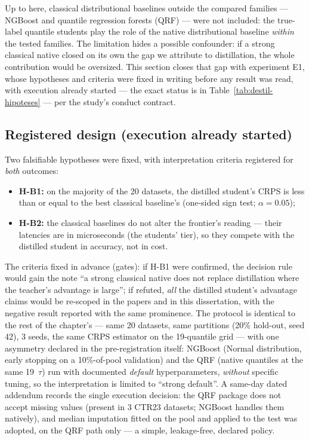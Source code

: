 Up to here, classical distributional baselines outside the compared
families --- NGBoost \citep{duan2020} and quantile regression
forests (QRF) \citep{meinshausen2006} --- were not included: the
true-label quantile students play the role of the native
distributional baseline \emph{within} the tested families. The
limitation hides a possible confounder: if a strong classical native
closed on its own the gap we attribute to distillation, the whole
contribution would be oversized. This section closes that gap with
experiment E1, whose hypotheses and criteria were fixed in writing
before any result was read, with execution already started --- the
exact status is in Table~\ref{tab:destil-hipoteses} --- per the
study's conduct contract.

\subsection{Registered design (execution already started)}
\label{sec:destil-e1-desenho}

Two falsifiable hypotheses were fixed, with interpretation criteria
registered for \emph{both} outcomes:

\begin{itemize}
  \item \textbf{H-B1:} on the majority of the 20 datasets, the
    distilled student's CRPS is less than or equal to the best
    classical baseline's (one-sided sign test; $\alpha = 0.05$);
  \item \textbf{H-B2:} the classical baselines do not alter the
    frontier's reading --- their latencies are in microseconds (the
    students' tier), so they compete with the distilled student in
    accuracy, not in cost.
\end{itemize}

The criteria fixed in advance (gates): if H-B1 were confirmed, the decision
rule would gain the note ``a strong classical native does not
replace distillation where the teacher's advantage is large''; if
refuted, \emph{all} the distilled student's advantage claims would
be re-scoped in the papers and in this dissertation, with the
negative result reported with the same prominence. The protocol is
identical to the rest of the chapter's --- same 20 datasets, same
partitions (20\% hold-out, seed 42), 3 seeds, the same CRPS
estimator on the 19-quantile grid --- with one asymmetry declared in
the pre-registration itself: NGBoost (Normal distribution, early
stopping on a 10\%-of-pool validation) and the QRF (native quantiles
at the same 19~$\tau$) run with documented \emph{default}
hyperparameters, \emph{without} specific tuning, so the
interpretation is limited to ``strong default''. A same-day dated
addendum records the single execution decision: the QRF package does
not accept missing values (present in 3 CTR23 datasets; NGBoost
handles them natively), and median imputation fitted on the pool and
applied to the test was adopted, on the QRF path only --- a simple,
leakage-free, declared policy.

